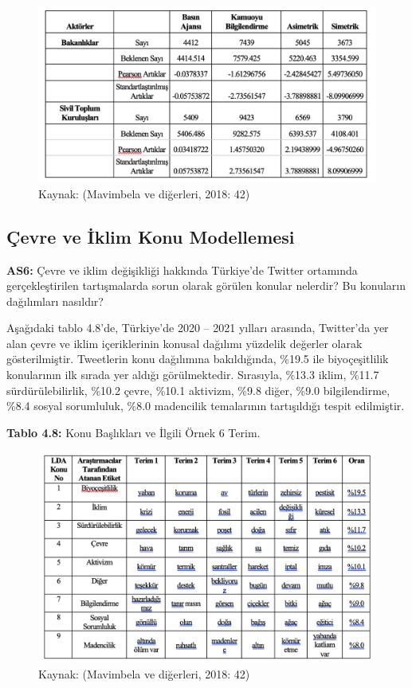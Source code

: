 \documentclass[
]{book}
\begin{document}
\begin{figure}
\includegraphics[width=0.95\linewidth,height=0.95\textheight]{tablolar-sekiller/tablo-4-7} \caption{Kaynak: (Mavimbela ve diğerleri, 2018: 42)}\label{fig:unnamed-chunk-11}
\end{figure}

\hypertarget{uxe7evre-ve-iklim-konu-modellemesi-1}{%
\subsection{Çevre ve İklim Konu Modellemesi}\label{uxe7evre-ve-iklim-konu-modellemesi-1}}

\textbf{AS6:} Çevre ve iklim değişikliği hakkında Türkiye'de Twitter ortamında gerçekleştirilen tartışmalarda sorun olarak görülen konular nelerdir? Bu konuların dağılımları nasıldır?

Aşağıdaki tablo 4.8'de, Türkiye'de 2020 -- 2021 yılları arasında, Twitter'da yer alan çevre ve iklim içeriklerinin konusal dağılımı yüzdelik değerler olarak gösterilmiştir. Tweetlerin konu dağılımına bakıldığında, \%19.5 ile biyoçeşitlilik konularının ilk sırada yer aldığı görülmektedir. Sırasıyla, \%13.3 iklim, \%11.7 sürdürülebilirlik, \%10.2 çevre, \%10.1 aktivizm, \%9.8 diğer, \%9.0 bilgilendirme, \%8.4 sosyal sorumluluk, \%8.0 madencilik temalarının tartışıldığı tespit edilmiştir.

\textbf{Tablo 4.8:} Konu Başlıkları ve İlgili Örnek 6 Terim.

\begin{figure}
\includegraphics[width=0.95\linewidth,height=0.95\textheight]{tablolar-sekiller/tablo-4-8} \caption{Kaynak: (Mavimbela ve diğerleri, 2018: 42)}\label{fig:unnamed-chunk-12}
\end{figure}
\end{document}
